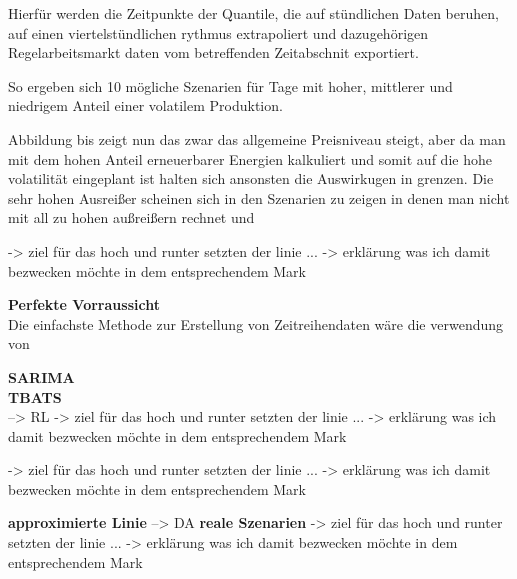Hierfür werden die Zeitpunkte der Quantile, die auf stündlichen Daten beruhen, auf einen viertelstündlichen rythmus extrapoliert und
dazugehörigen Regelarbeitsmarkt daten vom betreffenden Zeitabschnit exportiert.

So ergeben sich 10 mögliche Szenarien für Tage mit hoher, mittlerer und niedrigem Anteil einer volatilem Produktion.

Abbildung   bis
zeigt nun das zwar das allgemeine Preisniveau steigt, aber da man mit dem hohen Anteil erneuerbarer Energien
kalkuliert und somit auf die hohe volatilität eingeplant ist halten sich ansonsten die Auswirkugen in grenzen.
Die sehr hohen Ausreißer scheinen sich in den Szenarien zu zeigen in denen man nicht mit all zu hohen außreißern rechnet
und




-> ziel für das hoch und runter setzten der linie ... -> erklärung was ich damit bezwecken möchte in dem entsprechendem Mark


\textbf{Perfekte Vorraussicht}\\
Die einfachste Methode zur Erstellung von Zeitreihendaten wäre die verwendung von

\textbf{SARIMA}\\

\textbf{TBATS}\\
--> RL
-> ziel für das hoch und runter setzten der linie ... -> erklärung was ich damit bezwecken möchte in dem entsprechendem Mark


-> ziel für das hoch und runter setzten der linie ... -> erklärung was ich damit bezwecken möchte in dem entsprechendem Mark

\textbf{approximierte Linie}
--> DA
\textbf{reale Szenarien}
-> ziel für das hoch und runter setzten der linie ... -> erklärung was ich damit bezwecken möchte in dem entsprechendem Mark


